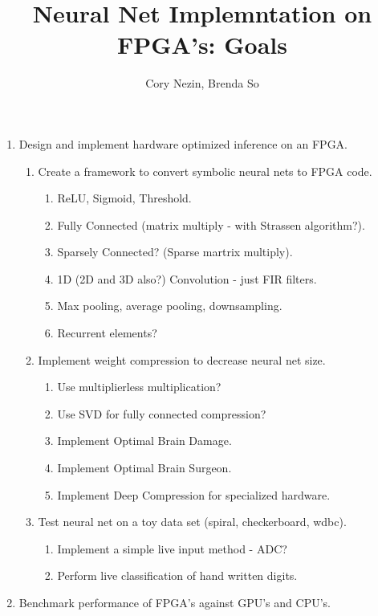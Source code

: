 \documentclass[12pt]{article}
\begin{document}
\title{Neural Net Implemntation on FPGA's: Goals}
\author{Cory Nezin, Brenda So}
\maketitle
\begin{enumerate}
\item Design and implement hardware optimized inference on an FPGA.
  \begin{enumerate}
    \item Create a framework to convert symbolic neural nets to FPGA code.
      \begin{enumerate}
        \item ReLU, Sigmoid, Threshold.
        \item Fully Connected (matrix multiply - with Strassen algorithm?).
        \item Sparsely Connected? (Sparse martrix multiply).
        \item 1D (2D and 3D also?) Convolution - just FIR filters.
        \item Max pooling, average pooling, downsampling.
        \item Recurrent elements?
      \end{enumerate}
    \item Implement weight compression to decrease neural net size.
      \begin{enumerate}
        \item Use multiplierless multiplication?
        \item Use SVD for fully connected compression?
        \item Implement Optimal Brain Damage.
        \item Implement Optimal Brain Surgeon.
        \item Implement Deep Compression for specialized hardware.
      \end{enumerate}
    \item Test neural net on a toy data set (spiral, checkerboard, wdbc).\
      \begin{enumerate}
        \item Implement a simple live input method - ADC?
        \item Perform live classification of hand written digits.
      \end{enumerate}
  \end{enumerate}
\item Benchmark performance of FPGA's against GPU's and CPU's.
  \begin{enumerate}

\end{enumerate}
\end{enumerate}
\end{document}
